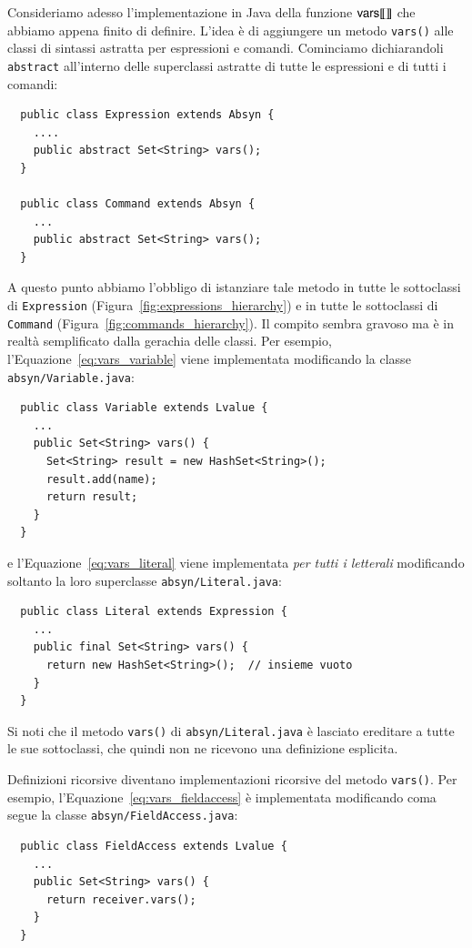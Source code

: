 Consideriamo adesso l'implementazione in Java della funzione
${\mathsf{vars}[\![{}]\!]}$ che abbiamo appena finito di definire. L'idea \`e di aggiungere
un metodo \texttt{vars()} alle classi di sintassi astratta per
espressioni e comandi. Cominciamo dichiarandoli \texttt{abstract}
all'interno delle superclassi astratte di tutte le espressioni e di
tutti i comandi:
%
\begin{verbatim}
  public class Expression extends Absyn {
    ....
    public abstract Set<String> vars();
  }

  public class Command extends Absyn {
    ...
    public abstract Set<String> vars();
  }
\end{verbatim}
%
A questo punto abbiamo l'obbligo di istanziare tale metodo in tutte
le sottoclassi di \texttt{Expression} (Figura~\ref{fig:expressions_hierarchy})
e in tutte le sottoclassi di \texttt{Command}
(Figura~\ref{fig:commands_hierarchy}). Il compito sembra gravoso ma \`e
in realt\`a semplificato dalla gerachia delle classi. Per esempio,
l'Equazione~\eqref{eq:vars_variable} viene implementata modificando la
classe \texttt{absyn/Variable.java}:
%
\begin{verbatim}
  public class Variable extends Lvalue {
    ...
    public Set<String> vars() {
      Set<String> result = new HashSet<String>();
      result.add(name);
      return result;
    }
  }
\end{verbatim}
%
e l'Equazione~\eqref{eq:vars_literal} viene implementata
\emph{per tutti i letterali} modificando soltanto
la loro superclasse \texttt{absyn/Literal.java}:
%
\begin{verbatim}
  public class Literal extends Expression {
    ...
    public final Set<String> vars() {
      return new HashSet<String>();  // insieme vuoto
    }
  }
\end{verbatim}
%
Si noti che il metodo \texttt{vars()} di \texttt{absyn/Literal.java} \`e
lasciato ereditare a tutte le sue sottoclassi, che quindi non ne ricevono
una definizione esplicita.

Definizioni ricorsive diventano implementazioni ricorsive del metodo
\texttt{vars()}. Per esempio, l'Equazione~\eqref{eq:vars_fieldaccess}
\`e implementata modificando coma segue
la classe \texttt{absyn/FieldAccess.java}:
%
\begin{verbatim}
  public class FieldAccess extends Lvalue {
    ...
    public Set<String> vars() {
      return receiver.vars();
    }
  }
\end{verbatim}

